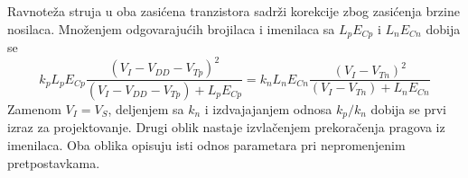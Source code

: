 Ravnoteža struja u oba zasićena tranzistora sadrži korekcije zbog zasićenja brzine nosilaca. Množenjem odgovarajućih brojilaca i imenilaca sa $L_pE_{Cp}$ i $L_nE_{Cn}$ dobija se
\[k_pL_pE_{Cp}\frac{(V_I-V_{DD}-V_{Tp})^2}{(V_I-V_{DD}-V_{Tp})+L_pE_{Cp}}=k_nL_nE_{Cn}\frac{(V_I-V_{Tn})^2}{(V_I-V_{Tn})+L_nE_{Cn}}\]
Zamenom $V_I=V_S$, deljenjem sa $k_n$ i izdvajajanjem odnosa $k_p/k_n$ dobija se prvi izraz za projektovanje. Drugi oblik nastaje izvlačenjem prekoračenja pragova iz imenilaca. Oba oblika opisuju isti odnos parametara pri nepromenjenim pretpostavkama.
